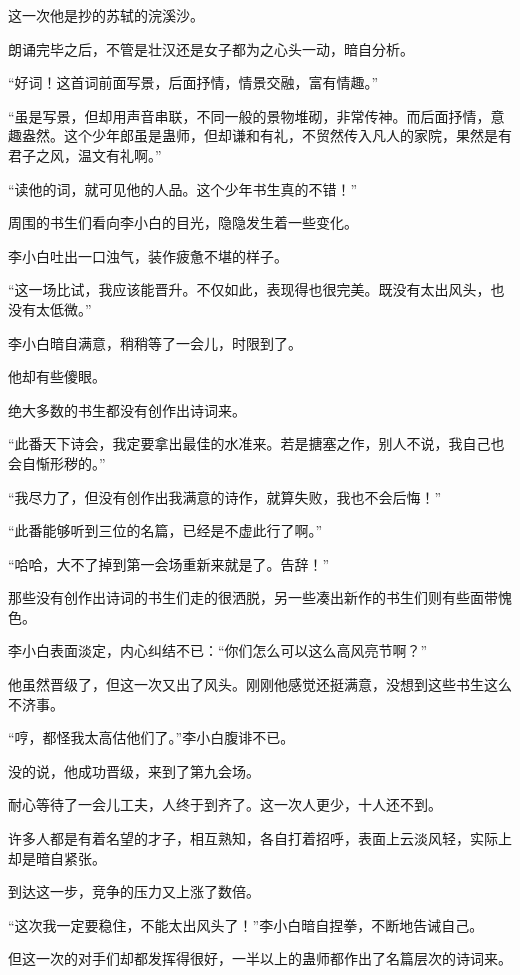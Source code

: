 \begin{this_body}
这一次他是抄的苏轼的浣溪沙。

朗诵完毕之后，不管是壮汉还是女子都为之心头一动，暗自分析。

“好词！这首词前面写景，后面抒情，情景交融，富有情趣。”

“虽是写景，但却用声音串联，不同一般的景物堆砌，非常传神。而后面抒情，意趣盎然。这个少年郎虽是蛊师，但却谦和有礼，不贸然传入凡人的家院，果然是有君子之风，温文有礼啊。”

“读他的词，就可见他的人品。这个少年书生真的不错！”

周围的书生们看向李小白的目光，隐隐发生着一些变化。

李小白吐出一口浊气，装作疲惫不堪的样子。

“这一场比试，我应该能晋升。不仅如此，表现得也很完美。既没有太出风头，也没有太低微。”

李小白暗自满意，稍稍等了一会儿，时限到了。

他却有些傻眼。

绝大多数的书生都没有创作出诗词来。

“此番天下诗会，我定要拿出最佳的水准来。若是搪塞之作，别人不说，我自己也会自惭形秽的。”

“我尽力了，但没有创作出我满意的诗作，就算失败，我也不会后悔！”

“此番能够听到三位的名篇，已经是不虚此行了啊。”

“哈哈，大不了掉到第一会场重新来就是了。告辞！”

那些没有创作出诗词的书生们走的很洒脱，另一些凑出新作的书生们则有些面带愧色。

李小白表面淡定，内心纠结不已：“你们怎么可以这么高风亮节啊？”

他虽然晋级了，但这一次又出了风头。刚刚他感觉还挺满意，没想到这些书生这么不济事。

“哼，都怪我太高估他们了。”李小白腹诽不已。

没的说，他成功晋级，来到了第九会场。

耐心等待了一会儿工夫，人终于到齐了。这一次人更少，十人还不到。

许多人都是有着名望的才子，相互熟知，各自打着招呼，表面上云淡风轻，实际上却是暗自紧张。

到达这一步，竞争的压力又上涨了数倍。

“这次我一定要稳住，不能太出风头了！”李小白暗自捏拳，不断地告诫自己。

但这一次的对手们却都发挥得很好，一半以上的蛊师都作出了名篇层次的诗词来。


\end{this_body}
